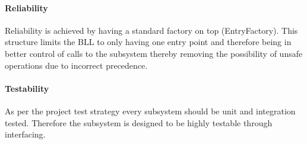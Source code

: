 \documentclass[../report.tex]{subfiles}
\begin{document}





\paragraph{Reliability}
Reliability is achieved by having a standard factory on top (EntryFactory). This structure limits the BLL to only having one entry point and therefore being in better control of calls to the subsystem thereby removing the possibility of unsafe operations due to incorrect precedence. 





\paragraph{Testability}
As per the project test strategy every subsystem should be unit and integration tested. Therefore the subsystem is designed to be highly testable through interfacing.
\end{document}
